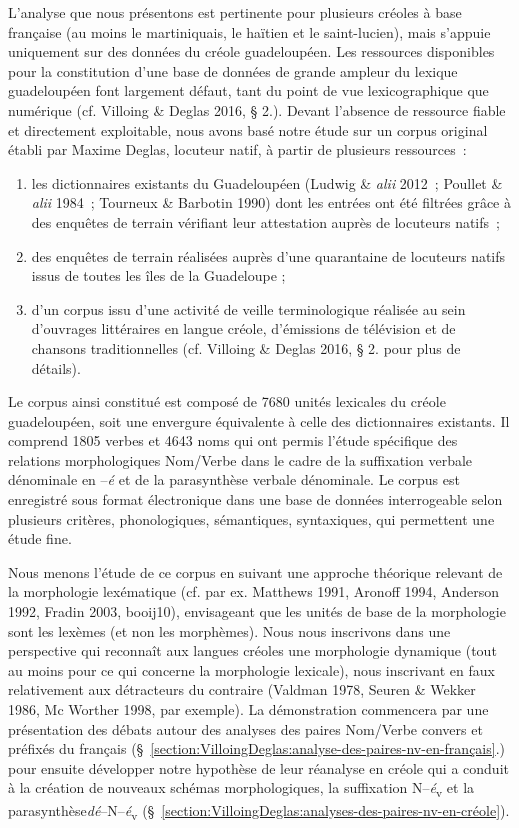 \documentclass[output=paper]{langsci/langscibook}
\begin{document}
L'analyse que nous présentons est pertinente pour plusieurs créoles à
base française (au moins le martiniquais, le haïtien et le
saint-lucien), mais s'appuie uniquement sur des données du créole
guadeloupéen. Les ressources disponibles pour la constitution d'une base
de données de grande ampleur du lexique guadeloupéen font largement
défaut, tant du point de vue lexicographique que numérique (cf. Villoing
\& Deglas 2016, § 2.). Devant l'absence de ressource fiable et
directement exploitable, nous avons basé notre étude sur un corpus
original établi par Maxime Deglas, locuteur natif, à partir de plusieurs
ressources~:

\begin{enumerate}\def\labelenumi{(\roman{enumi})}
\item
  les dictionnaires existants du Guadeloupéen (Ludwig \& \emph{alii}
  2012~; Poullet \& \emph{alii }1984~; Tourneux \& Barbotin 1990) dont
  les entrées ont été filtrées grâce à des enquêtes de terrain vérifiant
  leur attestation auprès de locuteurs natifs~;
\item
  des enquêtes de terrain réalisées auprès d'une quarantaine de
  locuteurs natifs issus de toutes les îles de la Guadeloupe ;
\item
  d'un corpus issu d'une activité de veille terminologique réalisée au
  sein d'ouvrages littéraires en langue créole, d'émissions de
  télévision et de chansons traditionnelles (cf. Villoing \& Deglas
  2016, § 2. pour plus de détails).~
\end{enumerate}

Le corpus ainsi constitué est composé de 7680 unités lexicales du créole
guadeloupéen, soit une envergure équivalente à celle des dictionnaires
existants. Il comprend 1805 verbes et 4643 noms qui ont permis l'étude
spécifique des relations morphologiques Nom/Verbe dans le cadre de la
suffixation verbale dénominale en --\emph{é} et de la parasynthèse
verbale dénominale. Le corpus est enregistré sous format électronique
dans une base de données interrogeable selon plusieurs critères,
phonologiques, sémantiques, syntaxiques, qui permettent une étude fine.

Nous menons l'étude de ce corpus en suivant une approche théorique
relevant de la morphologie lexématique (cf. par ex. Matthews 1991,
Aronoff 1994, Anderson 1992, Fradin 2003, booij10), envisageant que
les unités de base de la morphologie sont les lexèmes (et non les
morphèmes). Nous nous inscrivons dans une perspective qui reconnaît aux
langues créoles une morphologie dynamique (tout au moins pour ce qui
concerne la morphologie lexicale), nous inscrivant en faux relativement
aux détracteurs du contraire (Valdman 1978, Seuren \& Wekker 1986, Mc
Worther 1998, par exemple). La démonstration commencera par une
présentation des débats autour des analyses des paires Nom/Verbe convers
et préfixés du français (§~\ref{section:VilloingDeglas:analyse-des-paires-nv-en-français}.) pour ensuite développer notre hypothèse
de leur réanalyse en créole qui a conduit à la création de nouveaux
schémas morphologiques, la suffixation N--\emph{é}\textsubscript{v} et la
parasynthèse\emph{dé}--N--\emph{é}\textsubscript{v} (§~\ref{section:VilloingDeglas:analyses-des-paires-nv-en-créole}).
\end{document}
